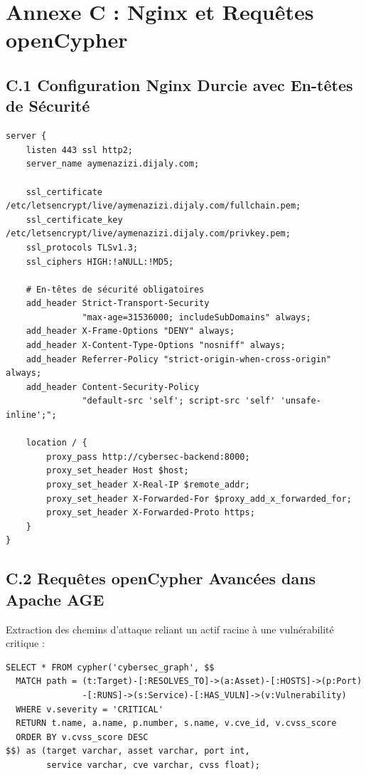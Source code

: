 \clearpage

\chapter*{Annexe C : Nginx et Requ\^etes openCypher}

\section*{C.1 Configuration Nginx Durcie avec En-t\^etes de S\'ecurit\'e}
{\footnotesize
\begin{verbatim}
server {
    listen 443 ssl http2;
    server_name aymenazizi.dijaly.com;

    ssl_certificate /etc/letsencrypt/live/aymenazizi.dijaly.com/fullchain.pem;
    ssl_certificate_key /etc/letsencrypt/live/aymenazizi.dijaly.com/privkey.pem;
    ssl_protocols TLSv1.3;
    ssl_ciphers HIGH:!aNULL:!MD5;

    # En-têtes de sécurité obligatoires
    add_header Strict-Transport-Security 
               "max-age=31536000; includeSubDomains" always;
    add_header X-Frame-Options "DENY" always;
    add_header X-Content-Type-Options "nosniff" always;
    add_header Referrer-Policy "strict-origin-when-cross-origin" always;
    add_header Content-Security-Policy 
               "default-src 'self'; script-src 'self' 'unsafe-inline';";

    location / {
        proxy_pass http://cybersec-backend:8000;
        proxy_set_header Host $host;
        proxy_set_header X-Real-IP $remote_addr;
        proxy_set_header X-Forwarded-For $proxy_add_x_forwarded_for;
        proxy_set_header X-Forwarded-Proto https;
    }
}
\end{verbatim}
}

\section*{C.2 Requ\^etes openCypher Avanc\'ees dans Apache AGE}
\par Extraction des chemins d'attaque reliant un actif racine \`a une vuln\'erabilit\'e critique :
{\footnotesize
\begin{verbatim}
SELECT * FROM cypher('cybersec_graph', $$
  MATCH path = (t:Target)-[:RESOLVES_TO]->(a:Asset)-[:HOSTS]->(p:Port)
               -[:RUNS]->(s:Service)-[:HAS_VULN]->(v:Vulnerability)
  WHERE v.severity = 'CRITICAL'
  RETURN t.name, a.name, p.number, s.name, v.cve_id, v.cvss_score
  ORDER BY v.cvss_score DESC
$$) as (target varchar, asset varchar, port int, 
        service varchar, cve varchar, cvss float);
\end{verbatim}
}

